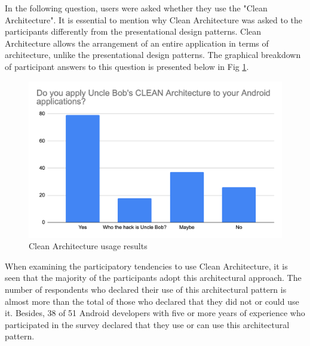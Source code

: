 In the following question, users were asked whether they use the "Clean Architecture". It is essential to mention why Clean Architecture was asked to the participants differently from the presentational design patterns. Clean Architecture allows the arrangement of an entire application in terms of architecture, unlike the presentational design patterns. The graphical breakdown of participant answers to this question is presented below in Fig \ref{fig:clean_arch}.
\begin{figure}[ht!]
    \centering
    \includegraphics[scale=0.33]{figures/clean_arch.png}
    \caption{Clean Architecture usage results}
    \label{fig:clean_arch}
\end{figure}
\FloatBarrier

When examining the participatory tendencies to use Clean Architecture, it is seen that the majority of the participants adopt this architectural approach. The number of respondents who declared their use of this architectural pattern is almost more than the total of those who declared that they did not or could use it. Besides, 38 of 51 Android developers with five or more years of experience who participated in the survey declared that they use or can use this architectural pattern.